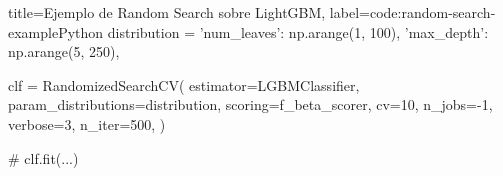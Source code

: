 \begin{code}[numbers=left]{title=Ejemplo de Random Search sobre LightGBM, label=code:random-search-example}{Python}
    distribution = {
        'num_leaves': np.arange(1, 100),
        'max_depth': np.arange(5, 250),
    }

    clf = RandomizedSearchCV(
        estimator=LGBMClassifier, 
        param_distributions=distribution,
        scoring=f_beta_scorer, 
        cv=10,
        n_jobs=-1, 
        verbose=3, 
        n_iter=500,
    )
    
    # clf.fit(...)
\end{code}